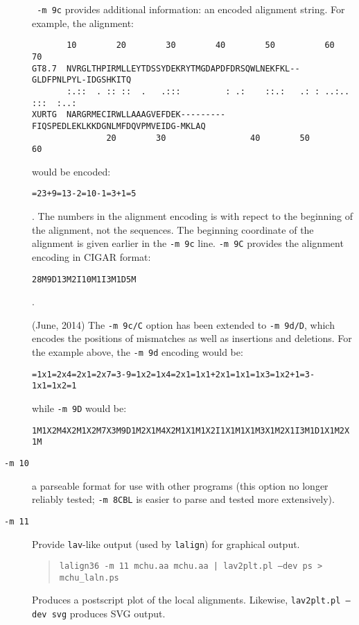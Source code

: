 \documentclass[11pt]{article}
\begin{document}
\begin{description}
\texttt{ -m 9c} provides additional information: an encoded alignment string.  For example, the alignment:
\begin{footnotesize}
\begin{verbatim}
       10        20        30        40        50          60         70  
GT8.7  NVRGLTHPIRMLLEYTDSSYDEKRYTMGDAPDFDRSQWLNEKFKL--GLDFPNLPYL-IDGSHKITQ
       :.::  . :: ::  .   .:::         : .:    ::.:   .: : ..:.. :::  :..:
XURTG  NARGRMECIRWLLAAAGVEFDEK---------FIQSPEDLEKLKKDGNLMFDQVPMVEIDG-MKLAQ
               20        30                 40        50        60        
\end{verbatim}
\end{footnotesize}
would be encoded:
\begin{footnotesize}
\texttt{=23+9=13-2=10-1=3+1=5}
\end{footnotesize}.
The numbers in the alignment encoding is with repect to the beginning
of the alignment, not the sequences.  The beginning coordinate of the
alignment is given earlier in the \texttt{-m 9c} line.  \texttt{-m 9C}
provides the alignment encoding in CIGAR format:
\begin{footnotesize}
\texttt{28M9D13M2I10M1I3M1D5M}
\end{footnotesize}.

(June, 2014) The \texttt{-m 9c/C} option has been extended to
\texttt{-m 9d/D}, which encodes the positions of mismatches as well as
insertions and deletions.  For the example above, the \texttt{-m 9d}
encoding would be:
\begin{footnotesize}
\texttt{=1x1=2x4=2x1=2x7=3-9=1x2=1x4=2x1=1x1+2x1=1x1=1x3=1x2+1=3-1x1=1x2=1}
\end{footnotesize}
while \texttt{-m 9D} would be:
\begin{footnotesize}
\texttt{1M1X2M4X2M1X2M7X3M9D1M2X1M4X2M1X1M1X2I1X1M1X1M3X1M2X1I3M1D1X1M2X1M}
\end{footnotesize}
\item[\texttt{-m 10}]
a parseable format for use with other programs (this option no longer reliably tested; \texttt{-m 8CBL} is easier to parse and tested more extensively).
\item[\texttt{-m 11}]
Provide \texttt{lav}-like output (used by \texttt{lalign}) for graphical output.
\begin{quote}
\texttt{lalign36 -m 11 mchu.aa mchu.aa | lav2plt.pl --dev ps  > mchu\_laln.ps}
\end{quote}
Produces a postscript plot of the local alignments.  Likewise,
\texttt{lav2plt.pl --dev svg} produces SVG output.


\end{description}
\end{document}

